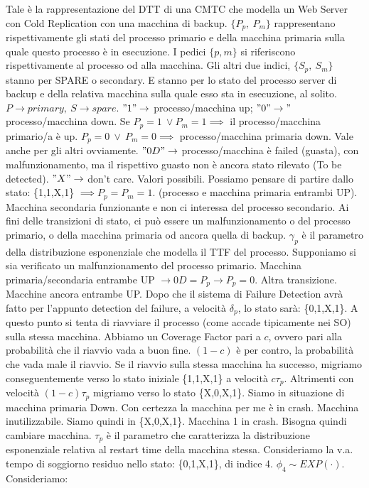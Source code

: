 Tale è la rappresentazione del DTT di una CMTC che modella un Web Server con Cold Replication con una macchina di backup. $\{P_p,\ P_m\}$ rappresentano rispettivamente gli stati del processo primario e della macchina primaria sulla quale questo processo è in esecuzione. I pedici $\{p,m\}$ si riferiscono rispettivamente al processo od alla macchina. Gli altri due indici, $\{S_p,\ S_m\}$ stanno per SPARE o secondary. E stanno per lo stato del processo server di backup e della relativa macchina sulla quale esso sta in esecuzione, al solito. $P \rightarrow primary,\ S \rightarrow spare$. $"1" \rightarrow$ processo/macchina up; $"0" \rightarrow"$ processo/macchina down. Se $P_p=1\ \lor P_m=1 \implies$ il processo/macchina primario/a è up. $P_p=0\ \lor\ P_m=0 \implies$ processo/macchina primaria down. Vale anche per gli altri ovviamente. $"0D" \rightarrow$ processo/macchina è failed (guasta), con malfunzionamento, ma il rispettivo guasto non è ancora stato rilevato (To be detected). $"X" \rightarrow$ don't care. Valori possibili. Possiamo pensare di partire dallo stato: \{1,1,X,1\} $\implies P_p=P_m=1$. (processo e macchina primaria entrambi UP). Macchina secondaria funzionante e non ci interessa del processo secondario. Ai fini delle transizioni di stato, ci può essere un malfunzionamento o del processo primario, o della macchina primaria od ancora quella di backup. $\gamma_p$ è il parametro della distribuzione esponenziale che modella il TTF del processo. Supponiamo si sia verificato un malfunzionamento del processo primario. Macchina primaria/secondaria entrambe UP $\rightarrow 0D=P_p \rightarrow P_p=0$. Altra transizione. Macchine ancora entrambe UP. Dopo che il sistema di Failure Detection avrà fatto per l'appunto detection del failure, a velocità $\delta_p$, lo stato sarà: \{0,1,X,1\}. A questo punto si tenta di riavviare il processo (come accade tipicamente nei SO) sulla stessa macchina. Abbiamo un Coverage Factor pari a $c$, ovvero pari alla probabilità che il riavvio vada a buon fine. $(1-c)$ è per contro, la probabilità che vada male il riavvio. Se il riavvio sulla stessa macchina ha successo, migriamo conseguentemente verso lo stato iniziale \{1,1,X,1\} a velocità $c\tau_p$. Altrimenti con velocità $(1-c)\tau_p$ migriamo verso lo stato \{X,0,X,1\}. Siamo in situazione di macchina primaria Down. Con certezza la macchina per me è in crash. Macchina inutilizzabile. Siamo quindi in \{X,0,X,1\}. Macchina 1 in crash. Bisogna quindi cambiare macchina. $\tau_p$ è il parametro che caratterizza la distribuzione esponenziale relativa al restart time della macchina stessa. Consideriamo la v.a. tempo di soggiorno residuo nello stato: \{0,1,X,1\}, di indice 4. $\phi_4 \sim EXP(\mathord{\cdot})$. Consideriamo:

